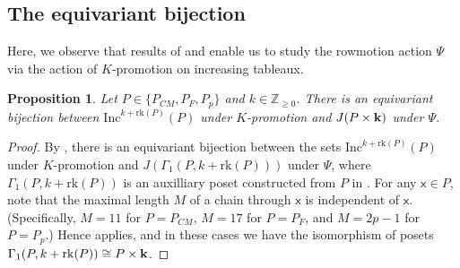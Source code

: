 \documentclass[12pt]{amsart}
\newcommand{\x}{\ensuremath{\mathsf{x}}}
\newtheorem{proposition}[theorem]{Proposition}
\theoremstyle{definition}
\theoremstyle{remark}
\numberwithin{equation}{section}
\newcommand{\inc}{\ensuremath{\mathrm{Inc}}}
\newcommand{\rank}{\ensuremath{\mathrm{rk}}}
\begin{document}
\subsection{The equivariant bijection}\label{sec:equivariant}

Here, we observe that results of \cite{DPS} and \cite{Dilks.Striker.Vorland} enable us to study the rowmotion action $\Psi$ via the action of $K$-promotion on increasing tableaux.

%
%
%

\begin{proposition}
Let $P \in \{ P_{CM}, P_F, P_p \}$ and $k \in \mathbb{Z}_{\geq 0}$.
There is an equivariant bijection between $\inc^{k+\rank(P)}(P)$ under $K$-promotion and $J(P \times {\bf k})$ under $\Psi$.
\end{proposition}
\begin{proof}
By \cite[Corollary~5.2]{Dilks.Striker.Vorland}, there is an equivariant bijection between the sets $\inc^{k+\rank(P)}(P)$ under $K$-promotion and $J(\Gamma_1(P,k+\rank(P)))$  under $\Psi$, where $\Gamma_1(P,k+\rank(P))$ is an auxilliary poset constructed from $P$ in \cite[]{Dilks.Striker.Vorland}.
For any $\x \in P$, note that the maximal length $M$ of a chain through $\x$ is independent of $\x$. (Specifically, $M = 11$ for $P = P_{CM}$, $M= 17$ for $P = P_F$, and $M = 2p-1$ for $P = P_p$.)
Hence \cite[Corollary~3.28]{Dilks.Striker.Vorland} applies, and in these cases we have the isomorphism of posets $\Gamma_1(P,k+\rank(P)) \cong P \times {\bf k}$.
\end{proof}
\end{document}

